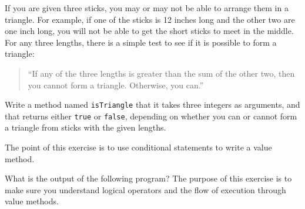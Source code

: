 \begin{exercise}
If you are given three sticks, you may or may not be able to arrange
them in a triangle.  For example, if one of the sticks is 12 inches
long and the other two are one inch long, you will
not be able to get the short sticks to meet in the middle.  For any
three lengths, there is a simple test to see if it is possible to form
a triangle:

\begin{quotation}
``If any of the three lengths is greater than the sum of the other two,
then you cannot form a triangle.  Otherwise, you can.''
\end{quotation}

Write a method named {\tt isTriangle} that it takes three integers as
arguments, and that returns either {\tt true} or {\tt false},
depending on whether you can or cannot form a triangle from sticks
with the given lengths.

The point of this exercise is to use conditional statements to
write a value method.

\end{exercise}


\begin{exercise}
What is the output of the following program?  The purpose of
this exercise is to make sure you understand logical operators
and the flow of execution through value methods.

\end{exercise}




